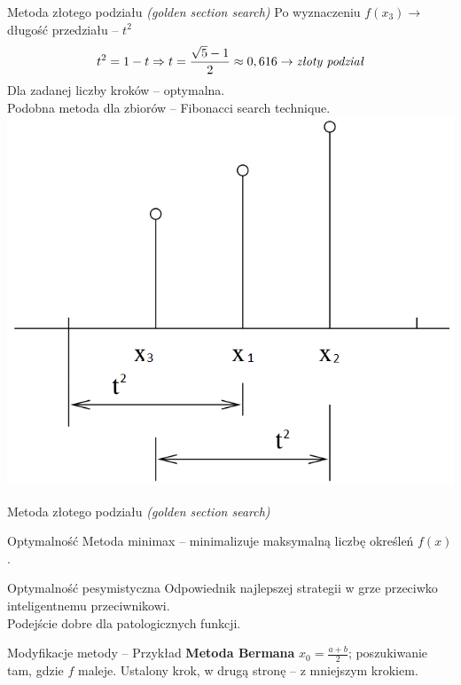   \begin{frame}{Metoda złotego podziału \emph{(golden section search)}}
    Po wyznaczeniu $f(x_3) \to$ długość przedziału -- $t^{2}$
    \begin{displaymath}
      t^{2} = 1 - t \Rightarrow t = \frac{\sqrt{5} - 1}{2} \approx 0,616 \to \text{\emph{złoty podział}}
    \end{displaymath}
    Dla zadanej liczby kroków -- optymalna.\\
    Podobna metoda dla zbiorów -- Fibonacci search technique.
    \centering
    \includegraphics[height=0.55\textheight]{img/17/fibb}
  \end{frame}

  \begin{frame}{Metoda złotego podziału \emph{(golden section search)}}
    \begin{block}{Optymalność}
      Metoda minimax -- minimalizuje maksymalną liczbę określeń
      $f(x)$.
    \end{block}
    \begin{block}{Optymalność pesymistyczna}
      Odpowiednik najlepszej strategii w grze przeciwko
      inteligentnemu przeciwnikowi.\\
      Podejście dobre dla patologicznych funkcji.
    \end{block}
    \begin{block}{Modyfikacje metody -- Przykład}
      \textbf{Metoda Bermana}
      $x_{0} = \frac{a + b}{2}$; poszukiwanie tam, gdzie $f$ maleje.
      Ustalony krok, w drugą stronę -- z mniejszym krokiem.
    \end{block}
  \end{frame}

